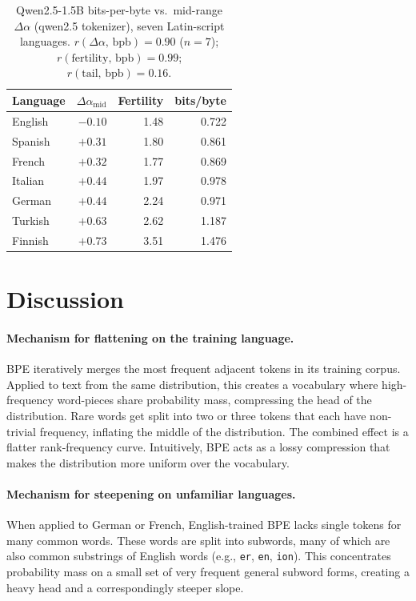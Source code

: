 \documentclass{article}
\begin{document}
\begin{table}[h]
  \caption{Qwen2.5-1.5B bits-per-byte vs.\ mid-range $\Delta\alpha$ (qwen2.5 tokenizer),
    seven Latin-script languages. $r(\Delta\alpha,\,\text{bpb}) = 0.90$ ($n=7$);
    $r(\text{fertility},\,\text{bpb}) = 0.99$; $r(\text{tail},\,\text{bpb}) = 0.16$.}
  \label{tab:down}
  \centering\small
  \begin{tabular}{lrrr}
    \toprule
    Language & $\Delta\alpha_{\text{mid}}$ & Fertility & bits/byte \\
    \midrule
    English & $-0.10$ & 1.48 & 0.722 \\
    Spanish & $+0.31$ & 1.80 & 0.861 \\
    French  & $+0.32$ & 1.77 & 0.869 \\
    Italian & $+0.44$ & 1.97 & 0.978 \\
    German  & $+0.44$ & 2.24 & 0.971 \\
    Turkish & $+0.63$ & 2.62 & 1.187 \\
    Finnish & $+0.73$ & 3.51 & 1.476 \\
    \bottomrule
  \end{tabular}
\end{table}


\section{Discussion}
\label{sec:discussion}

\paragraph{Mechanism for flattening on the training language.}
BPE iteratively merges the most frequent adjacent tokens in its training corpus. Applied
to text from the same distribution, this creates a vocabulary where high-frequency
word-pieces share probability mass, compressing the head of the distribution. Rare words
get split into two or three tokens that each have non-trivial frequency, inflating the
middle of the distribution. The combined effect is a flatter rank-frequency curve.
Intuitively, BPE acts as a lossy compression that makes the distribution more uniform
over the vocabulary.

\paragraph{Mechanism for steepening on unfamiliar languages.}
When applied to German or French, English-trained BPE lacks single tokens for many
common words. These words are split into subwords, many of which are also common
substrings of English words (e.g., \texttt{er}, \texttt{en}, \texttt{ion}). This
concentrates probability mass on a small set of very frequent general subword forms,
creating a heavy head and a correspondingly steeper slope.
\end{document}
